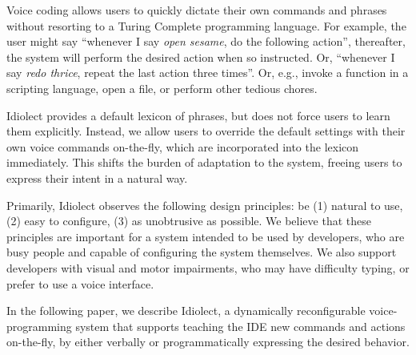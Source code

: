 \documentclass[conference]{IEEEtran}
\begin{document}

Voice coding allows users to quickly dictate their own commands and phrases without resorting to a Turing Complete programming language. For example, the user might say ``whenever I say \textit{open sesame}, do the following action'', thereafter, the system will perform the desired action when so instructed. Or, ``whenever I say \textit{redo thrice}, repeat the last action three times''. Or, e.g., invoke a function in a scripting language, open a file, or perform other tedious chores.

Idiolect provides a default lexicon of phrases, but does not force users to learn them explicitly. Instead, we allow users to override the default settings with their own voice commands on-the-fly, which are incorporated into the lexicon immediately. This shifts the burden of adaptation to the system, freeing users to express their intent in a natural way.

Primarily, Idiolect observes the following design principles: be (1) natural to use, (2) easy to configure, (3) as unobtrusive as possible. We believe that these principles are important for a system intended to be used by developers, who are busy people and capable of configuring the system themselves. We also support developers with visual and motor impairments, who may have difficulty typing, or prefer to use a voice interface.

In the following paper, we describe Idiolect, a dynamically reconfigurable voice-programming system that supports teaching the IDE new commands and actions on-the-fly, by either verbally or programmatically expressing the desired behavior.

\end{document}
